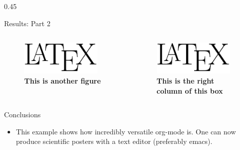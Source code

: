 \documentclass[final]{beamer}
\begin{document}
\begin{frame}[label={sec:org8f3d3e7}]{}
\begin{columns}
\begin{column}[t]{0.45\textwidth\columnwidth}
\begin{block}{Results: Part 2}
\begin{columns}
\begin{column}[T]{0.48\columnwidth}
\captionsetup{justification=justified,width=.8\linewidth}
\begin{figure}[htbp]
\centering
\includegraphics[page=3,width=0.9\textwidth]{org-mode-poster-4.png}
\caption{\label{fig:org51482b3}
\textbf{This is another figure}}
\end{figure}
\end{column}

\begin{column}[T]{0.48\columnwidth}
\captionsetup{justification=justified,width=.8\linewidth}
\begin{figure}[htbp]
\centering
\includegraphics[page=9,width=0.9\textwidth]{org-mode-poster-4.png}
\caption{\label{fig:org2cc1106}
\textbf{This is the right column of this box}}
\end{figure}
\end{column}
\end{columns}
\end{block}

\begin{block}{Conclusions}
\begin{itemize}
\item This example shows how incredibly versatile org-mode is. One can now
produce scientific posters with a text editor (preferably emacs).
\end{itemize}
\end{block}
\end{column}
\end{columns}
\end{frame}
\end{document}
